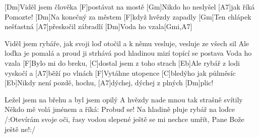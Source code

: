 
[Dm]Viděl jsem člověka [F]postávat na mostě
[Gm]Nikdo ho neslyšel [A7]jak říká Pomozte!
[Dm]Na konečný za městem [F]když hvězdy zapadly
[Gm]Ten chlápek nešťastná [A7]přeskočil zábradlí
[Dm]Voda ho vzala[Gmi,A7]

Viděl jsem rybáře, jak svoji loď otočil
a k němu vesluje, vesluje ze všech sil
Ale loďka je pomalá a proud ji strhává
pod hladinou mizí topící se postava
Voda ho vzala
[F]Bylo mi do breku, [C]dostal jsem z toho strach
[Eb]Ale rybář z lodi vyskočí a [A7]běží po vlnách
[F]Vytáhne utopence [C]bledýho jak půlměsíc
[Eb]Nikdy není pozdě, hochu, [A7]dýchej, dýchej z plných [Dm]plic!

Ležel jsem na břehu a byl jsem opilý
A hvězdy nade mnou tak strašně svítily
Někdo mě volá jménem a říká: Probuď se!
Na hladině pluje rybář na loďce
/:Otevírám svoje oči, řasy vodou slepené
ještě se mi nechce umřít, Pane Bože ještě ne!:/
